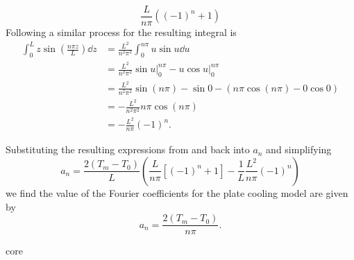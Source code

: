 {    \[
        \frac{L}{n \pi}((-1)^n + 1)
    \]
    Following a similar process for  the resulting integral is
    \begin{align*}
        \int_0^L z \sin \left( \frac{n \pi z}{L} \right) \dd{z} &= 
        \frac{L^2}{n^2 \pi^2} \int_0^{n \pi} u \sin u \dd{u} \\
        &= \frac{L^2}{n^2 \pi^2} \left. \sin u \right|_0^{n\pi} - \left. u \cos u \right|_0^{n\pi} \\
        &= \frac{L^2}{n^2 \pi^2} \sin (n\pi) - \sin 0 - (n\pi \cos(n\pi) - 0 \cos 0) \\
        &= - \frac{L^2}{n^2 \pi^2} n \pi \cos(n\pi) \\
        &= - \frac{L^2}{n \pi} (-1)^n .
    \end{align*}

    Substituting the resulting expressions from  and  back into $a_n$ and simplifying
    \[
        a_n = \frac{2 (T_m - T_0)}{L} \left( \frac{L}{n \pi}[(-1)^n + 1] -
        \frac{1}{L} \frac{L^2}{n \pi} (-1)^n \right)
    \]
    we find the value of the Fourier coefficients for the plate cooling model are given by
    \[
        a_n = \frac{2(T_m - T_0)}{n \pi} .
    \]
}{core}\label{box:platecooling}
\FloatBarrier

